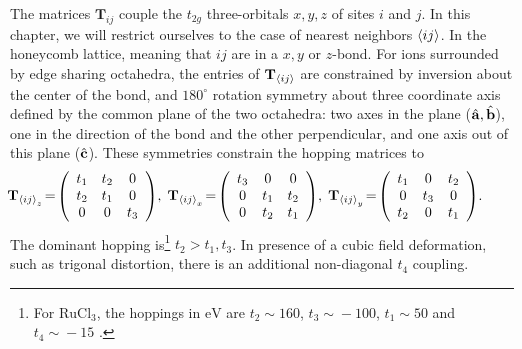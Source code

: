 The matrices $ \mathbf{T}_{ij }$ couple the $t_{2g}$ three-orbitals $x, y, z$ of sites $i$ and $j$.
In this chapter, we will restrict ourselves to the case of nearest neighbors $\braket{ij}$.
In the honeycomb lattice, meaning that $ij$ are in a $x,y$ or $z$-bond.
For ions surrounded by {edge sharing octahedra}, the entries of $\mathbf{T}_{\braket{ij}}$ are constrained by inversion about the center of the bond, and $180^\circ$ rotation symmetry about three coordinate axis defined by the common plane %
of the two octahedra: two axes in the plane ($\hat{\mathbf a}, \hat{\mathbf b}$), one in the direction of the bond and the other perpendicular, and one axis out of this plane ($\hat{\mathbf c}$).
These symmetries constrain the hopping matrices to \cite{Rau2014}
\begin{align}\hspace*{-5mm}
    \mathbf{T}_{\braket{ij}_z} \! & = \!
    \left(
    \begin{array}{ccc}
         t_1 & t_2  & {0} \\
         t_2 & t_1  & {0} \\
         {0} & {0}  & t_3 \\
    \end{array}
    \right) \!, \;
        \mathbf{T}_{\braket{ij}_x} \!  = \!
    \left(
    \begin{array}{ccc}
         t_3 & {0}  & {0} \\
         {0} & t_1  & t_2 \\
         {0} & t_2  & t_1 \\
    \end{array}
    \right)\! , \;
        \mathbf{T}_{\braket{ij}_y}  \!= \!
    \left(
    \begin{array}{ccc}
         t_1 & {0}  & t_2 \\
         {0} & t_3  & {0} \\
         t_2 & {0}  & t_1 \\
    \end{array}
    \right)   \!   .
\end{align}
The dominant hopping is\footnote{For $\text{RuCl}_3$, the hoppings in $\text{eV}$ are $t_2\!\sim\!160$, $t_3\!\sim\!-100$, $t_1\!\sim\!50$ and $t_4\!\sim\!-15$ \cite{Winter_2016}.}  $t_2 > t_1,t_3$. In presence of a cubic field deformation, such as trigonal distortion, there is an additional non-diagonal $t_4$ coupling. %
